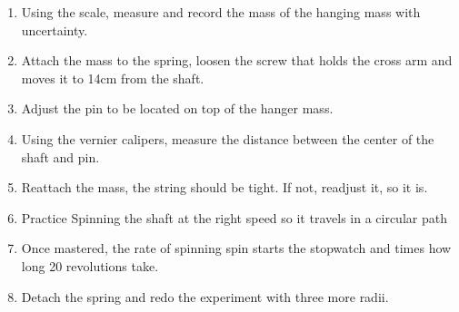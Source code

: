 

{}


{}

\begin{enumerate}
	\item {Using the scale, measure and record the mass of the hanging mass with uncertainty.}
	\item {Attach the mass to the spring, loosen the screw that holds the cross arm and moves it to 14cm from the shaft.}
	\item {Adjust the pin to be located on top of the hanger mass.}
	\item {Using the vernier calipers, measure the distance between the center of the shaft and pin.}
	\item {Reattach the mass, the string should be tight. If not, readjust it, so it is.}
	\item {Practice Spinning the shaft at the right speed so it travels in a circular path}
	\item {Once mastered, the rate of spinning spin starts the stopwatch and times how long 20 revolutions take.}
	\item {Detach the spring and redo the experiment with three more radii.}
\end{enumerate}



